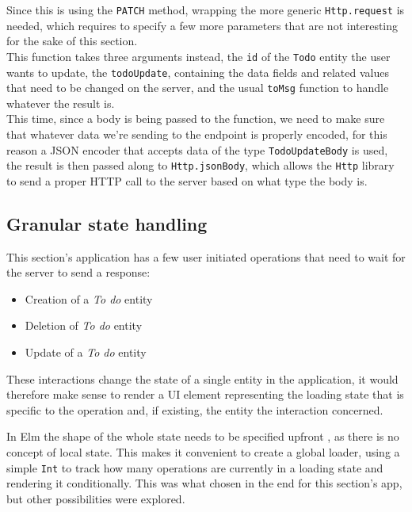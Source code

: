 \begin{sloppypar}
Since this is using the \texttt{PATCH} method, wrapping the more generic \texttt{Http.request} is needed, which requires to specify a few more parameters that are not interesting for the sake of this section.\\
This function takes three arguments instead, the \texttt{id} of the \texttt{Todo} entity the user wants to update, the \texttt{todoUpdate}, containing the data fields and related values that need to be changed on the server, and the usual \texttt{toMsg} function to handle whatever the result is.\\
This time, since a body is being passed to the function, we need to make sure that whatever data we're sending to the endpoint is properly encoded, for this reason a JSON encoder that accepts data of the type \texttt{TodoUpdateBody} is used, the result is then passed along to \texttt{Http.jsonBody}, which allows the \texttt{Http} library to send a proper HTTP call to the server based on what type the body is.
\end{sloppypar}

\subsection{Granular state handling}
This section's application has a few user initiated operations that need to wait for the server to send a response:
\begin{itemize}
    \item Creation of a \textit{To do} entity
    \item Deletion of \textit{To do} entity
    \item Update of a \textit{To do} entity
\end{itemize}
These interactions change the state of a single entity in the application, it would therefore make sense to render a UI element representing the loading state that is specific to the operation and, if existing, the entity the interaction concerned.

In Elm the shape of the whole state needs to be specified upfront \cite{noauthor_elm_nodate}, as there is no concept of local state. This makes it convenient to create a global loader, using a simple \texttt{Int} to track how many operations are currently in a loading state and rendering it conditionally. This was what chosen in the end for this section's app, but other possibilities were explored.\\

